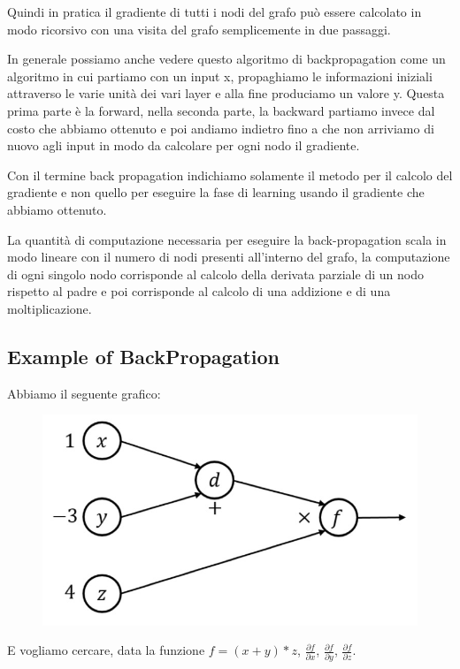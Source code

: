\documentclass[14pt]{extreport}
\begin{document}
Quindi in pratica il gradiente di tutti i nodi del grafo può essere calcolato in modo ricorsivo con una visita del grafo semplicemente in due
passaggi.

In generale possiamo anche vedere questo algoritmo di backpropagation come un algoritmo in cui partiamo con un input x, propaghiamo le informazioni
iniziali attraverso le varie unità dei vari layer e alla fine produciamo un valore y. Questa prima parte è la forward, nella seconda parte, la
backward partiamo invece dal costo che abbiamo ottenuto e poi andiamo indietro fino a che non arriviamo di nuovo agli input in modo da calcolare per
ogni nodo il gradiente.

Con il termine back propagation indichiamo solamente il metodo per il calcolo del gradiente e non quello per eseguire la fase di learning usando il
gradiente che abbiamo ottenuto.

La quantità di computazione necessaria per eseguire la back-propagation scala in modo lineare con il numero di nodi presenti all'interno del grafo, la
computazione di ogni singolo nodo corrisponde al calcolo della derivata parziale di un nodo rispetto al padre e poi corrisponde al calcolo di una
addizione e di una moltiplicazione.

\subsection{Example of BackPropagation}

Abbiamo il seguente grafico:

\begin{figure}[H]
	\centering
	\includegraphics[width=0.5\linewidth]{390.jpeg}
\end{figure}

E vogliamo cercare, data la funzione $f = (x+y)*z$, $\frac{\partial f}{\partial x}$,  $\frac{\partial f}{\partial y}$,  $\frac{\partial f}{\partial
z}$.
\end{document}
